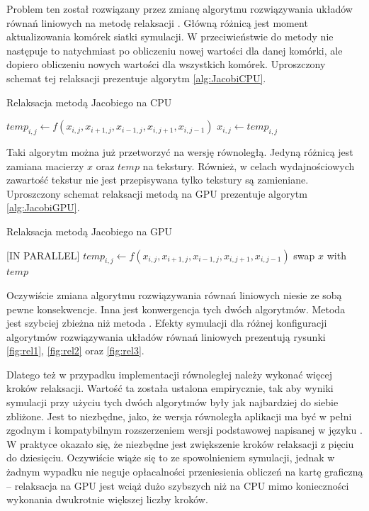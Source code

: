 Problem ten został rozwiązany przez zmianę algorytmu rozwiązywania układów
równań liniowych na metodę relaksacji . Główną różnicą jest moment
aktualizowania komórek siatki symulacji. W przeciwieństwie do metody  nie następuje to natychmiast po obliczeniu nowej wartości dla danej
komórki, ale dopiero obliczeniu nowych wartości dla wszystkich komórek.
Uproszczony schemat tej relaksacji prezentuje algorytm \ref{alg:JacobiCPU}.

\begin{algorithm}[H]
  \caption{Relaksacja metodą Jacobiego na CPU}
  \label{alg:JacobiCPU}
\begin{algorithmic}
    \State $temp_{i,j}\gets f(x_{i,j}, x_{i+1,j}, x_{i-1,j}, x_{i,j+1}, x_{i,j-1})$
  \EndFor
    \State $x_{i,j}\gets temp_{i,j}$
  \EndFor
\EndFor
\end{algorithmic}
\end{algorithm}

Taki algorytm można już przetworzyć na wersję równoległą. Jedyną różnicą jest
zamiana macierzy $x$ oraz $temp$ na tekstury. Również, w celach wydajnościowych
zawartość tekstur nie jest przepisywana tylko tekstury są zamieniane.
Uproszczony schemat relaksacji metodą  na GPU prezentuje algorytm
\ref{alg:JacobiGPU}.

\begin{algorithm}[H]
  \caption{Relaksacja metodą Jacobiego na GPU}
  \label{alg:JacobiGPU}
\begin{algorithmic}
   [IN PARALLEL]
    \State $temp_{i,j}\gets f(x_{i,j}, x_{i+1,j}, x_{i-1,j}, x_{i,j+1}, x_{i,j-1})$
  \EndFor
  \State swap $x$ with $temp$
\EndFor
\end{algorithmic}
\end{algorithm}

Oczywiście zmiana algorytmu rozwiązywania równań liniowych niesie ze sobą pewne
konsekwencje. Inna jest konwergencja tych dwóch algorytmów. Metoda  jest szybciej zbieżna niż metoda . Efekty symulacji dla
różnej konfiguracji algorytmów rozwiązywania układów równań liniowych prezentują
rysunki \ref{fig:rel1}, \ref{fig:rel2} oraz \ref{fig:rel3}. 



Dlatego też w przypadku implementacji równoległej należy wykonać więcej kroków
relaksacji. Wartość ta została ustalona empirycznie, tak aby wyniki symulacji
przy użyciu tych dwóch algorytmów były jak najbardziej do siebie zbliżone. Jest
to niezbędne, jako, że wersja równoległa aplikacji \en ma być w pełni zgodnym i
kompatybilnym rozszerzeniem wersji podstawowej napisanej w języku
. W praktyce okazało się, że niezbędne jest zwiększenie kroków
relaksacji z pięciu do dziesięciu. Oczywiście wiąże się to ze spowolnieniem
symulacji, jednak w żadnym wypadku nie neguje opłacalności przeniesienia
obliczeń na kartę graficzną -- relaksacja na GPU jest wciąż dużo szybszych niż
na CPU mimo konieczności wykonania dwukrotnie większej liczby kroków.

